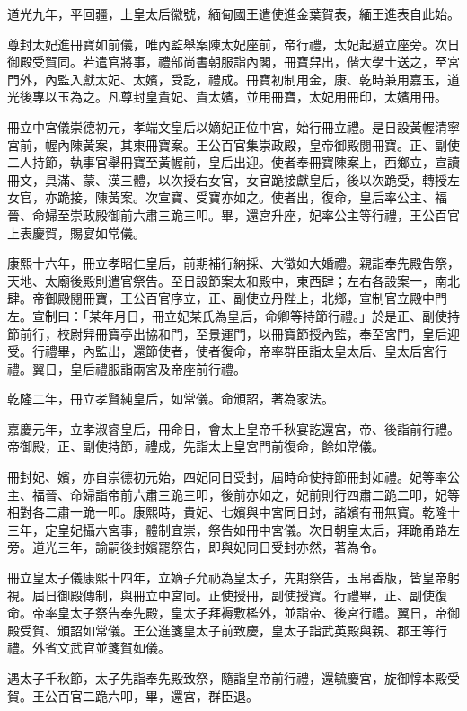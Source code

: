 \begin{pinyinscope}
道光九年，平回疆，上皇太后徽號，緬甸國王遣使進金葉賀表，緬王進表自此始。

尊封太妃進冊寶如前儀，唯內監舉案陳太妃座前，帝行禮，太妃起避立座旁。次日御殿受賀同。若遣官將事，禮部尚書朝服詣內閣，冊寶舁出，偕大學士送之，至宮門外，內監入獻太妃、太嬪，受訖，禮成。冊寶初制用金，康、乾時兼用嘉玉，道光後專以玉為之。凡尊封皇貴妃、貴太嬪，並用冊寶，太妃用冊印，太嬪用冊。

冊立中宮儀崇德初元，孝端文皇后以嫡妃正位中宮，始行冊立禮。是日設黃幄清寧宮前，幄內陳黃案，其東冊寶案。王公百官集崇政殿，皇帝御殿閱冊寶。正、副使二人持節，執事官舉冊寶至黃幄前，皇后出迎。使者奉冊寶陳案上，西鄉立，宣讀冊文，具滿、蒙、漢三體，以次授右女官，女官跪接獻皇后，後以次跪受，轉授左女官，亦跪接，陳黃案。次宣寶、受寶亦如之。使者出，復命，皇后率公主、福晉、命婦至崇政殿御前六肅三跪三叩。畢，還宮升座，妃率公主等行禮，王公百官上表慶賀，賜宴如常儀。

康熙十六年，冊立孝昭仁皇后，前期補行納採、大徵如大婚禮。親詣奉先殿告祭，天地、太廟後殿則遣官祭告。至日設節案太和殿中，東西肆；左右各設案一，南北肆。帝御殿閱冊寶，王公百官序立，正、副使立丹陛上，北鄉，宣制官立殿中門左。宣制曰：「某年月日，冊立妃某氏為皇后，命卿等持節行禮。」於是正、副使持節前行，校尉舁冊寶亭出協和門，至景運門，以冊寶節授內監，奉至宮門，皇后迎受。行禮畢，內監出，還節使者，使者復命，帝率群臣詣太皇太后、皇太后宮行禮。翼日，皇后禮服詣兩宮及帝座前行禮。

乾隆二年，冊立孝賢純皇后，如常儀。命頒詔，著為家法。

嘉慶元年，立孝淑睿皇后，冊命日，會太上皇帝千秋宴訖還宮，帝、後詣前行禮。帝御殿，正、副使持節，禮成，先詣太上皇宮門前復命，餘如常儀。

冊封妃、嬪，亦自崇德初元始，四妃同日受封，屆時命使持節冊封如禮。妃等率公主、福晉、命婦詣帝前六肅三跪三叩，後前亦如之，妃前則行四肅二跪二叩，妃等相對各二肅一跪一叩。康熙時，貴妃、七嬪與中宮同日封，諸嬪有冊無寶。乾隆十三年，定皇妃攝六宮事，體制宜崇，祭告如冊中宮儀。次日朝皇太后，拜跪甬路左旁。道光三年，諭嗣後封嬪罷祭告，即與妃同日受封亦然，著為令。

冊立皇太子儀康熙十四年，立嫡子允礽為皇太子，先期祭告，玉帛香版，皆皇帝躬視。屆日御殿傳制，與冊立中宮同。正使授冊，副使授寶。行禮畢，正、副使復命。帝率皇太子祭告奉先殿，皇太子拜褥敷檻外，並詣帝、後宮行禮。翼日，帝御殿受賀、頒詔如常儀。王公進箋皇太子前致慶，皇太子詣武英殿與親、郡王等行禮。外省文武官並箋賀如儀。

遇太子千秋節，太子先詣奉先殿致祭，隨詣皇帝前行禮，還毓慶宮，旋御惇本殿受賀。王公百官二跪六叩，畢，還宮，群臣退。


\end{pinyinscope}
